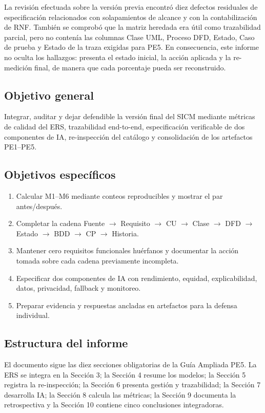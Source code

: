 \documentclass[11pt,a4paper]{article}
\begin{document}
	La revisión efectuada sobre la versión previa encontró diez defectos residuales de especificación relacionados con solapamientos de alcance y con la contabilización de RNF. También se comprobó que la matriz heredada era útil como trazabilidad parcial, pero no contenía las columnas Clase UML, Proceso DFD, Estado, Caso de prueba y Estado de la traza exigidas para PE5. En consecuencia, este informe no oculta los hallazgos: presenta el estado inicial, la acción aplicada y la re-medición final, de manera que cada porcentaje pueda ser reconstruido.
		
	\subsection{Objetivo general}
	Integrar, auditar y dejar defendible la versión final del SICM mediante métricas de calidad del ERS, trazabilidad end-to-end, especificación verificable de dos componentes de IA, re-inspección del catálogo y consolidación de los artefactos PE1--PE5.
	
	\subsection{Objetivos específicos}
	\begin{enumerate}[label=OE\arabic*.]
		\item Calcular M1--M6 mediante conteos reproducibles y mostrar el par antes/después.
		\item Completar la cadena Fuente $\rightarrow$ Requisito $\rightarrow$ CU $\rightarrow$ Clase $\rightarrow$ DFD $\rightarrow$ Estado $\rightarrow$ BDD $\rightarrow$ CP $\rightarrow$ Historia.
		\item Mantener cero requisitos funcionales huérfanos y documentar la acción tomada sobre cada cadena previamente incompleta.
		\item Especificar dos componentes de IA con rendimiento, equidad, explicabilidad, datos, privacidad, fallback y monitoreo.
		\item Preparar evidencia y respuestas ancladas en artefactos para la defensa individual.
	\end{enumerate}
	\subsection{Estructura del informe}
	El documento sigue las diez secciones obligatorias de la Guía Ampliada PE5. La ERS se integra en la Sección 3; la Sección 4 resume los modelos; la Sección 5 registra la re-inspección; la Sección 6 presenta gestión y trazabilidad; la Sección 7 desarrolla IA; la Sección 8 calcula las métricas; la Sección 9 documenta la retrospectiva y la Sección 10 contiene cinco conclusiones integradoras.
	\clearpage
\end{document}
